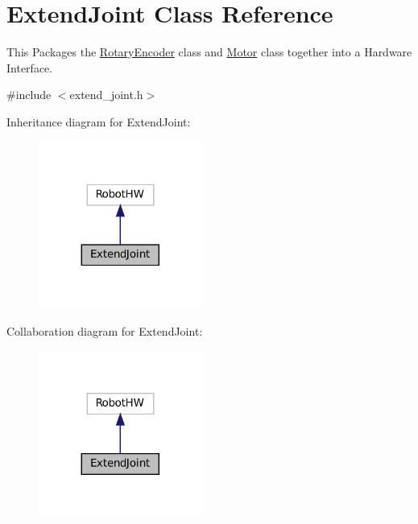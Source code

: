 \hypertarget{classExtendJoint}{}\section{Extend\+Joint Class Reference}
\label{classExtendJoint}


This Packages the \hyperlink{classRotaryEncoder}{Rotary\+Encoder} class and \hyperlink{classMotor}{Motor} class together into a Hardware Interface.  




{\ttfamily \#include $<$extend\+\_\+joint.\+h$>$}



Inheritance diagram for Extend\+Joint\+:\nopagebreak
\begin{figure}[H]
\begin{center}
\leavevmode
\includegraphics[width=152pt]{classExtendJoint__inherit__graph}
\end{center}
\end{figure}


Collaboration diagram for Extend\+Joint\+:\nopagebreak
\begin{figure}[H]
\begin{center}
\leavevmode
\includegraphics[width=152pt]{classExtendJoint__coll__graph}
\end{center}
\end{figure}
